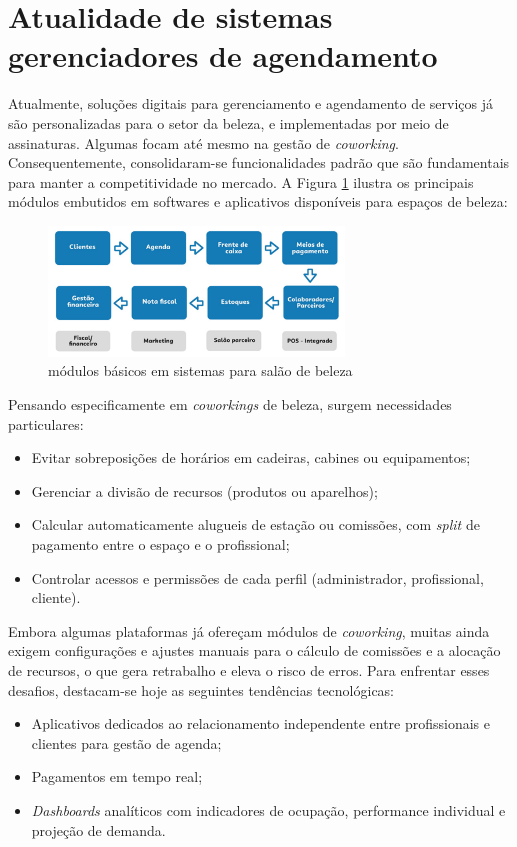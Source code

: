 \section{Atualidade de sistemas gerenciadores de agendamento}

Atualmente, soluções digitais para gerenciamento e agendamento de serviços já são personalizadas para o setor da beleza, e implementadas por meio de assinaturas. Algumas focam até mesmo na gestão de \emph{coworking}. Consequentemente, consolidaram-se funcionalidades padrão que são fundamentais para manter a competitividade no mercado. A Figura \ref{fig:modulos} ilustra os principais módulos embutidos em softwares e aplicativos disponíveis para espaços de beleza:

\begin{figure}[htb]
	\centering
	\includegraphics[width=0.7\textwidth]{cap02-Revisao_literatura/Images/modulos_basicos_sistema}
	\caption{módulos básicos em sistemas para salão de beleza}
	\label{fig:modulos}
\end{figure}


Pensando especificamente em \emph{coworkings} de beleza, surgem necessidades particulares:
\begin{itemize}
	\item Evitar sobreposições de horários em cadeiras, cabines ou equipamentos;
	\item Gerenciar a divisão de recursos (produtos ou aparelhos);
	\item Calcular automaticamente alugueis de estação ou comissões, com \emph{split} de pagamento entre o espaço e o profissional;
	\item Controlar acessos e permissões de cada perfil (administrador, profissional, cliente).
\end{itemize}

Embora algumas plataformas já ofereçam módulos de \emph{coworking}, muitas ainda exigem configurações e ajustes manuais para o cálculo de comissões e a alocação de recursos, o que gera retrabalho e eleva o risco de erros. Para enfrentar esses desafios, destacam-se hoje as seguintes tendências tecnológicas:
\begin{itemize}
	\item Aplicativos dedicados ao relacionamento independente entre profissionais e clientes para gestão de agenda;
	\item Pagamentos em tempo real;
	\item \emph{Dashboards} analíticos com indicadores de ocupação, performance individual e projeção de demanda.
\end{itemize}

